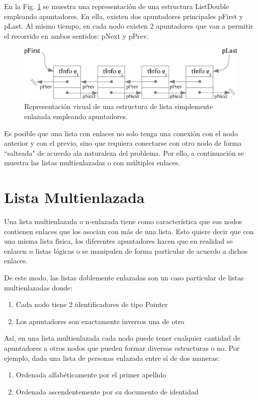 En la Fig. \ref{fig:listas2} se muestra una representación de una estructura ListDouble empleando apuntadores. En ella, existen dos apuntadores principales pFirst y pLast. Al mismo tiempo, en cada nodo existen 2 apuntadores que van a permitir el recorrido en ambos sentidos: pNext y pPrev.

\begin{figure}[!htb]
\centering
\includegraphics[scale=.7]{images/listas2.eps}
\caption{Representación visual de una estructura de lista simplemente enlazada empleando apuntadores.}
\label{fig:listas2}
\end{figure}

Es posible que una lista con enlaces no solo tenga una conexión con el nodo anterior y con el previo, sino que requiera conectarse con otro nodo de forma ``salteada" de acuerdo ala naturaleza del problema. Por ello, a continuación se muestra las listas multienlazadas o con múltiples enlaces.

\section{Lista Multienlazada}

Una lista multienlazada o n-enlazada tiene como característica que sus nodos contienen enlaces que los asocian con más de una lista. Esto quiere decir que con una misma lista física, los diferentes apuntadores hacen que en realidad se enlacen $n$ listas lógicas o se manipulen de forma particular de acuerdo a dichos enlaces.

De este modo, las listas doblemente enlazadas son un caso particular de listas multienlazadas donde:
\begin{enumerate}
\item Cada nodo tiene 2 identificadores de tipo Pointer
\item Los apuntadores son exactamente inversos una de otro
\end{enumerate}

Así, en una lista multienlazada cada nodo puede tener cualquier cantidad de apuntadores a otros nodos que pueden formar diversas estructuras o no. Por ejemplo, dada una lista de personas enlazada entre sí de dos maneras:
\begin{enumerate}
\item Ordenada alfabéticamente por el primer apellido
\item Ordenada ascendentemente por su documento de identidad
\end{enumerate}

